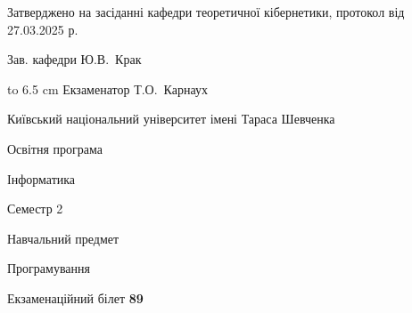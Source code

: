 \documentclass[12pt, ukrainian]{article}
\begin{document}
{\smallskip\smallskip \begin {scriptsize} Затверджено на засіданні кафедри теоретичної кібернетики, протокол   від   27.03.2025 р.\par\smallskip\smallskip\smallskip\smallskip
{\parbox {6.5 cm} {Зав. кафедри \dotfill Ю.В.~Крак}}\hspace {0.7cm} {\hbox to 6.5 cm { Екзаменатор \dotfill Т.О.~Карнаух}} \end{scriptsize}}
\newpage
{{\begin {scriptsize}\par
{ \center  Київський національний університет імені Тараса Шевченка \par}
{\parbox {5 cm}{Освітня програма \hfill}{\parbox {7 cm}{Інформатика\hfill}}\parbox {6 cm}{\hfill Семестр 2}}\par
{\parbox {5 cm} {Навчальний предмет \hfill}\parbox {7 cm}{Програмування \hfill}\parbox {6cm}{\hfill}\par}\vspace{-15pt} \end{scriptsize}}{\center Екзаменаційний білет \No \textbf { 89 }\par}}
\end{document}
